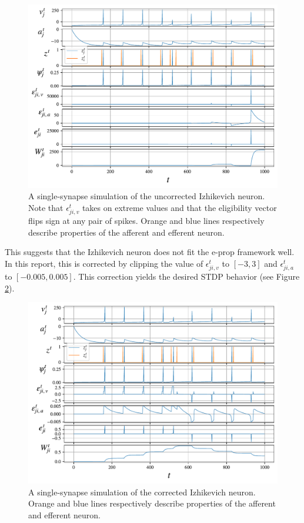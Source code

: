 		\begin{figure}[!ht]
		    \centering
		    \includegraphics[width=\linewidth]{gfx/demo_izh}
		    \caption[Uncorrected Izhikevich neuron simulation]{A single-synapse simulation of the uncorrected Izhikevich neuron. Note that $\epsilon^t_{ji, v}$ takes on extreme values and that the eligibility vector flips sign at any pair of spikes. Orange and blue lines respectively describe properties of the afferent and efferent neuron.}
		    \label{fig:demo_izh}
		\end{figure}

	    This suggests that the Izhikevich neuron does not fit the e-prop framework well.
	    In this report, this is corrected by clipping the value of $\epsilon^t_{ji,v}$ to $\left[-3, 3\right]$ and $\epsilon^t_{ji,a}$ to $\left[-0.005, 0.005\right]$.
	    This correction yields the desired STDP behavior (see Figure \ref{fig:demo_izh_corrected}).

        \begin{figure}[!ht]
            \centering
            \includegraphics[width=\linewidth]{gfx/demo_izh_corrected}
            \caption[Corrected Izhikevich neuron simulation]{A single-synapse simulation of the corrected Izhikevich neuron. Orange and blue lines respectively describe properties of the afferent and efferent neuron.}
            \label{fig:demo_izh_corrected}
        \end{figure}


